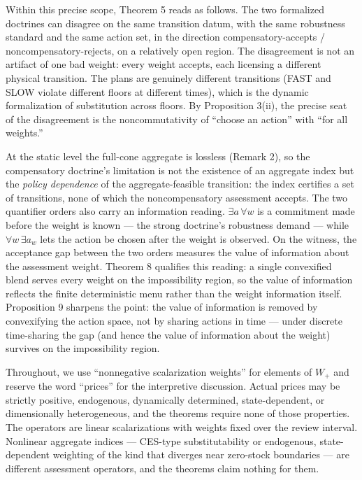 \documentclass[11pt]{article}
\begin{document}
Within this precise scope, Theorem 5 reads as follows. The two
formalized doctrines can disagree on the same transition datum, with the
same robustness standard and the same action set, in the direction
compensatory-accepts / noncompensatory-rejects, on a relatively open
region. The disagreement is not an artifact of one bad weight: every
weight accepts, each licensing a different physical transition. The
plans are genuinely different transitions (FAST and SLOW violate
different floors at different times), which is the dynamic formalization
of substitution across floors. By Proposition 3(ii), the precise seat of
the disagreement is the noncommutativity of ``choose an action'' with
``for all weights.''

At the static level the full-cone aggregate is lossless (Remark 2), so the compensatory doctrine's limitation is not the existence of an aggregate index but the \emph{policy dependence} of the aggregate-feasible transition: the index certifies a set of transitions, none of which the noncompensatory assessment accepts. The two
quantifier orders also carry an information reading.
\(\exists a\, \forall w\) is a commitment made before the weight is
known --- the strong doctrine's robustness demand --- while
\(\forall w\, \exists a_w\) lets the action be chosen after the weight
is observed. On the witness, the acceptance gap between the two orders
measures the value of information about the assessment weight. Theorem 8 qualifies this reading: a single convexified blend serves every weight on the impossibility region, so the value of information reflects the finite deterministic menu rather than the weight information itself. Proposition 9 sharpens the point: the value of information is removed by convexifying the action space, not by sharing actions in time --- under discrete time-sharing the gap (and
hence the value of information about the weight) survives on the
impossibility region.

Throughout, we use ``nonnegative scalarization weights'' for elements of
\(W_+\) and reserve the word ``prices'' for the interpretive discussion.
Actual prices may be strictly positive, endogenous,
dynamically determined, state-dependent, or dimensionally heterogeneous,
and the theorems require none of those properties. The operators are
linear scalarizations with weights fixed over the review interval.
Nonlinear aggregate indices --- CES-type substitutability or endogenous,
state-dependent weighting of the kind that diverges near zero-stock
boundaries --- are different assessment operators, and the theorems
claim nothing for them.
\end{document}
